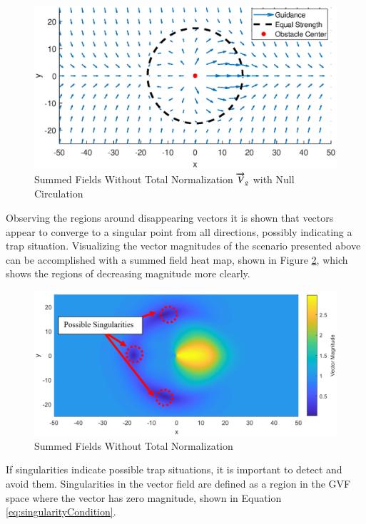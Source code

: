 \documentclass[numbered,pdftex]{ohio-etd}
\begin{document}
\begin{figure}[H]
	\centering
	\includegraphics[trim=25 35 25 50,clip,width=14cm]{PaperFigures/Methods/summedFieldsNoNorm}
	\caption{Summed Fields Without Total Normalization $\protect \overrightarrow{V}_g$ with Null Circulation}
	\label{fig:summedFieldsNoNorm}
\end{figure}

Observing the regions around disappearing vectors it is shown that vectors appear to converge to a singular point from all directions, possibly indicating a trap situation. Visualizing the vector magnitudes of the scenario presented above can be accomplished with a summed field heat map, shown in Figure \ref{fig:summedHeatMap}, which shows the regions of decreasing magnitude more clearly. 


\begin{figure}[H]
	\centering
	\includegraphics[trim=0 0 0 0,clip,width=14cm]{Figures/methods/summedHeatMapSimple2}
	\caption{Summed Fields Without Total Normalization}
	\label{fig:summedHeatMap}
\end{figure}

If singularities indicate possible trap situations, it is important to detect and avoid them. Singularities in the vector field are defined as a region in the GVF space where the vector has zero magnitude, shown in Equation \ref{eq:singularityCondition}.
\end{document}
